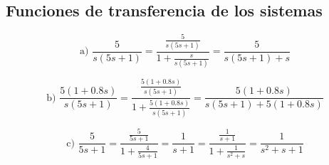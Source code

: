 \documentclass[10pt]{article}
\theoremstyle{definition}
\theoremstyle{remark}
\theoremstyle{definition}
\numberwithin{equation}{prob}
\begin{document}
\newpage

\subsection{Funciones de transferencia de los sistemas}

\begin{equation}
	\text{a) } \frac{5}{s(5s+1)} = \frac{\frac{5}{s(5s+1)}}{1 + \frac{s}{s(5s+1)}} = \frac{5}{s(5s+1) + s}
\end{equation}

\begin{equation}
	\text{b) } \frac{5(1+0.8s)}{s(5s+1)} = \frac{\frac{5(1+0.8s)}{s(5s+1)}}{1 + \frac{5(1+0.8s)}{s(5s+1)}} = \frac{5(1+0.8s)}{s(5s+1) + 5(1+0.8s)}
\end{equation}

\begin{equation}
	\text{c) } \frac{5}{5s+1} = \frac{\frac{5}{5s+1}}{1 + \frac{4}{5s+1}} = \frac{1}{s+1} = \frac{\frac{1}{s+1}}{1 + \frac{1}{s^2+s}} = \frac{1}{s^2 + s + 1}
\end{equation}
\end{document}
